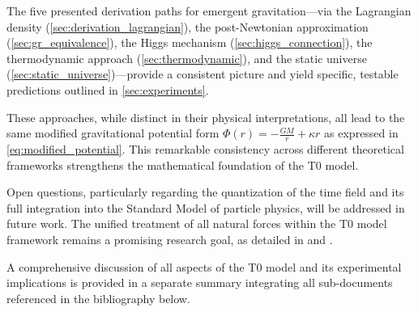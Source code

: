 \documentclass[12pt,a4paper]{article}
\begin{document}
	The five presented derivation paths for emergent gravitation—via the Lagrangian density (\cref{sec:derivation_lagrangian}), the post-Newtonian approximation (\cref{sec:gr_equivalence}), the Higgs mechanism (\cref{sec:higgs_connection}), the thermodynamic approach (\cref{sec:thermodynamic}), and the static universe (\cref{sec:static_universe})—provide a consistent picture and yield specific, testable predictions outlined in \cref{sec:experiments}.
	
	These approaches, while distinct in their physical interpretations, all lead to the same modified gravitational potential form \(\Phi(r) = -\frac{GM}{r} + \kappa r\) as expressed in \cref{eq:modified_potential}. This remarkable consistency across different theoretical frameworks strengthens the mathematical foundation of the T0 model.
	
	Open questions, particularly regarding the quantization of the time field and its full integration into the Standard Model of particle physics, will be addressed in future work. The unified treatment of all natural forces within the T0 model framework remains a promising research goal, as detailed in \cite{pascher_lagrange_2025} and \cite{pascher_higgs_2025}.
	
	A comprehensive discussion of all aspects of the T0 model and its experimental implications is provided in a separate summary integrating all sub-documents referenced in the bibliography below.
	
\end{document}
